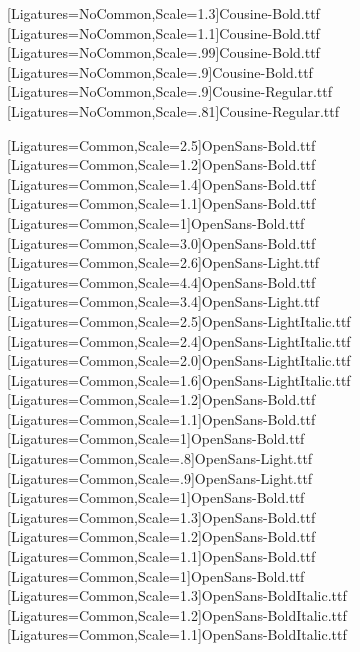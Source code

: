 \usepackage{amsmath}
\usepackage{mathspec}

\setmonofont[Ligatures=NoCommon,Scale=.9,SlantedFont={Cousine-Italic.ttf},BoldFont={Cousine-Bold.ttf},BoldSlantedFont={Cousine-BoldItalic.ttf}]{Cousine-Regular.ttf} %
\newfontface{\SecCode}[Ligatures=NoCommon,Scale=1.3]{Cousine-Bold.ttf}
\newfontface{\SubsecCode}[Ligatures=NoCommon,Scale=1.1]{Cousine-Bold.ttf}
\newfontface{\SubsubsecCode}[Ligatures=NoCommon,Scale=.99]{Cousine-Bold.ttf}
\newfontface{\ParaCode}[Ligatures=NoCommon,Scale=.9]{Cousine-Bold.ttf}
\newfontface{\SubparaCode}[Ligatures=NoCommon,Scale=.9]{Cousine-Regular.ttf}
\newfontface{\RHCode}[Ligatures=NoCommon,Scale=.81]{Cousine-Regular.ttf}

\setsansfont[Ligatures=Common,Scale=1,SlantedFont={OpenSans-LightItalic.ttf},BoldFont={OpenSans-Bold.ttf},BoldSlantedFont={OpenSans-BoldItalic.ttf}]{OpenSans-Light.ttf} %
\newfontface{\sfbHugeRomeo}[Ligatures=Common,Scale=2.5]{OpenSans-Bold.ttf}
\newfontface{\cmssbxparttocRomeo}[Ligatures=Common,Scale=1.2]{OpenSans-Bold.ttf}
\newfontface{\cmssbxsectionRomeo}[Ligatures=Common,Scale=1.4]{OpenSans-Bold.ttf}
\newfontface{\cmssbxelevenRomeo}[Ligatures=Common,Scale=1.1]{OpenSans-Bold.ttf}
\newfontface{\cmssbxchaptocRomeo}[Ligatures=Common,Scale=1]{OpenSans-Bold.ttf}
\newfontface{\cmssbxchaptitleRomeo}[Ligatures=Common,Scale=3.0]{OpenSans-Bold.ttf}
\newfontface{\cmsschapnameRomeo}[Ligatures=Common,Scale=2.6]{OpenSans-Light.ttf}
\newfontface{\cmssbxpartRomeo}[Ligatures=Common,Scale=4.4]{OpenSans-Bold.ttf}
\newfontface{\cmssparttitleRomeo}[Ligatures=Common,Scale=3.4]{OpenSans-Light.ttf}
\newfontface{\sfiHugeRomeo}[Ligatures=Common,Scale=2.5]{OpenSans-LightItalic.ttf}
\newfontface{\sfititleRomeo}[Ligatures=Common,Scale=2.4]{OpenSans-LightItalic.ttf}
\newfontface{\sfihalftitleRomeo}[Ligatures=Common,Scale=2.0]{OpenSans-LightItalic.ttf}
\newfontface{\sfiauthorRomeo}[Ligatures=Common,Scale=1.6]{OpenSans-LightItalic.ttf}
\newfontface{\sfblargeRomeo}[Ligatures=Common,Scale=1.2]{OpenSans-Bold.ttf}
\newfontface{\sfbelevenRomeo}[Ligatures=Common,Scale=1.1]{OpenSans-Bold.ttf}
\newfontface{\sfbRomeo}[Ligatures=Common,Scale=1]{OpenSans-Bold.ttf}
\newfontface{\sfeightRomeo}[Ligatures=Common,Scale=.8]{OpenSans-Light.ttf}
\newfontface{\sfnineRomeo}[Ligatures=Common,Scale=.9]{OpenSans-Light.ttf}
[Ligatures=Common,Scale=1]{OpenSans-Bold.ttf}
\newfontface{\sfbsectionRomeo}[Ligatures=Common,Scale=1.3]{OpenSans-Bold.ttf}
\newfontface{\sfbsubsecRomeo}[Ligatures=Common,Scale=1.2]{OpenSans-Bold.ttf}
\newfontface{\sfbsubsubRomeo}[Ligatures=Common,Scale=1.1]{OpenSans-Bold.ttf}
\newfontface{\sfbparaRomeo}[Ligatures=Common,Scale=1]{OpenSans-Bold.ttf}
\newfontface{\sfbsectionitalRomeo}[Ligatures=Common,Scale=1.3]{OpenSans-BoldItalic.ttf}
\newfontface{\sfbsubsecitalRomeo}[Ligatures=Common,Scale=1.2]{OpenSans-BoldItalic.ttf}
\newfontface{\sfbsubsubsecitalRomeo}[Ligatures=Common,Scale=1.1]{OpenSans-BoldItalic.ttf}

